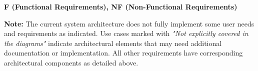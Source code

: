 \documentclass[11pt,a4paper]{article}
\begin{document}
\begin{table}
\vspace{8pt} %

\textbf{F (Functional Requirements), NF (Non-Functional Requirements)}

\vspace{8pt} %

\textbf{Note:} The current system architecture does not fully implement some user needs and requirements as indicated. Use cases marked with \textit{"Not explicitly covered in the diagrams"} indicate architectural elements that may need additional documentation or implementation. All other requirements have corresponding architectural components as detailed above.
\end{table}





\end{document}
